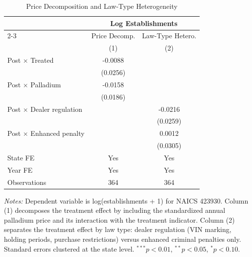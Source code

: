 \begin{table}[htbp]
\centering
\caption{Price Decomposition and Law-Type Heterogeneity}
\label{tab:decomposition}
\begin{threeparttable}
\begin{tabular}{lcc}
\toprule
 & \multicolumn{2}{c}{Log Establishments} \\
\cmidrule(lr){2-3}
 & Price Decomp. & Law-Type Hetero. \\
 & (1) & (2) \\
\midrule
Post $\times$ Treated & -0.0088 & \\
 & (0.0256) & \\
Post $\times$ Palladium & -0.0158 & \\
 & (0.0186) & \\
\addlinespace
Post $\times$ Dealer regulation & & -0.0216 \\
 & & (0.0259) \\
Post $\times$ Enhanced penalty & & 0.0012 \\
 & & (0.0305) \\
\addlinespace
State FE & Yes & Yes \\
Year FE & Yes & Yes \\
Observations & 364 & 364 \\
\bottomrule
\end{tabular}
\begin{tablenotes}[flushleft]
\small
\item \textit{Notes:} Dependent variable is log(establishments + 1) for NAICS 423930. Column (1) decomposes the treatment effect by including the standardized annual palladium price and its interaction with the treatment indicator. Column (2) separates the treatment effect by law type: dealer regulation (VIN marking, holding periods, purchase restrictions) versus enhanced criminal penalties only. Standard errors clustered at the state level. $^{***}p<0.01$, $^{**}p<0.05$, $^{*}p<0.10$.
\end{tablenotes}
\end{threeparttable}
\end{table}


